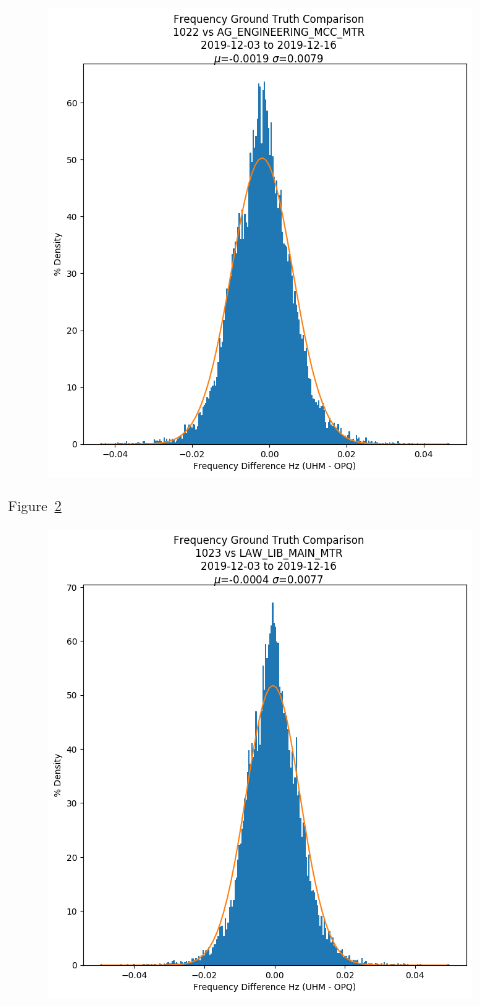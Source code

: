 \begin{figure}[H]
    \centering
    \includegraphics[width=\linewidth]{figures/f_hist_1022_AG_ENGINEERING_MCC_MTR.png}
    \caption{}
    \label{fig:f_hist_1022_AG_ENGINEERING_MCC_MTR}
\end{figure}

Figure~\ref{fig:f_hist_1023_LAW_LIB_MAIN_MTR}

\begin{figure}[H]
    \centering
    \includegraphics[width=\linewidth]{figures/f_hist_1023_LAW_LIB_MAIN_MTR.png}
    \caption{}
    \label{fig:f_hist_1023_LAW_LIB_MAIN_MTR}
\end{figure}

